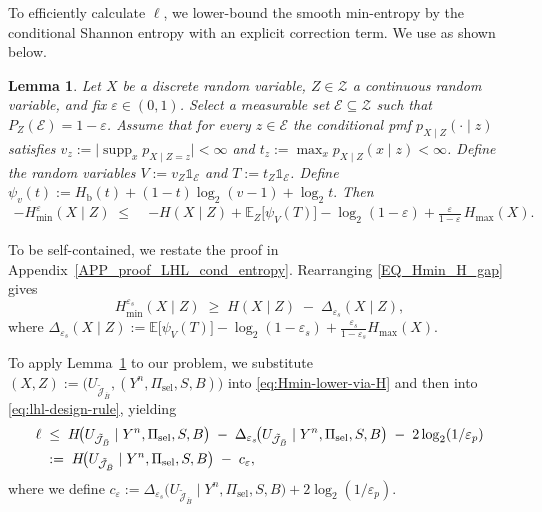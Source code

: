 \documentclass[onecolumn]{IEEEtran} %
\newcommand{\1}{\mathbbm{1}}
\theoremstyle{boldremark}
\DeclareMathOperator{\supp}{supp}
\newtheorem{lemma}{Lemma}
\begin{document}
To efficiently calculate $\ell$, we lower-bound the smooth min-entropy by the conditional Shannon entropy with an explicit correction term.
We use \cite[Lemma~1]{heerklotz2025neuralestimationinformationleakage} as shown below.
\begin{lemma}\label{Lemma_Hmin_H_gap}
Let $X$ be a discrete random variable, $Z\in\mathcal Z$ a continuous random variable, and fix $\varepsilon\in(0,1)$.
Select a measurable set $\mathcal E\subseteq\mathcal Z$ such that $P_Z(\mathcal E)=1-\varepsilon$.
Assume that for every $z\in\mathcal E$ the conditional \gls{pmf} $p_{X\mid Z}(\cdot\mid z)$ satisfies
$v_{z}:=\bigl|\supp_x p_{X\mid Z=z}\bigr|<\infty$ and $t_{z}:=\max_{x}p_{X\mid Z}(x\mid z)<\infty$.
Define the random variables $V:=v_{Z}\mathds{1}_{\mathcal E}$ and $T:=t_{Z}\mathds{1}_{\mathcal E}$.
Define $\psi_{v}(t):=H_{\mathrm b}(t)+(1-t)\log_{2}(v-1)+\log_{2}t.$ Then
{\small
\begin{align}\label{EQ_Hmin_H_gap}
-H_{\min}^{\varepsilon}(X\mid Z)
 \;\le\;&
   -H(X\mid Z)
   +\mathbb{E}_Z\!\bigl[\psi_{V}(T)\bigr]-\log_{2}(1-\varepsilon)
   +\frac{\varepsilon}{1-\varepsilon}\,H_{\max}(X).
\end{align}}
\end{lemma}

To be self-contained, we restate the proof in Appendix~\ref{APP_proof_LHL_cond_entropy}.
Rearranging \eqref{EQ_Hmin_H_gap} gives
\begin{equation}\label{eq:Hmin-lower-via-H}
H_{\min}^{\varepsilon_s}(X\mid Z)
\;\ge\;
H(X\mid Z)
\;-\;
\Delta_{\varepsilon_s}(X\mid Z),
\end{equation}
where $\Delta_{\varepsilon_s}(X\mid Z):=\mathbb{E}\!\big[\psi_V(T)\big]
-\log_2(1-\varepsilon_s)+\frac{\varepsilon_s}{1-\varepsilon_s}H_{\max}(X).$

To apply Lemma~\ref{Lemma_Hmin_H_gap} to our problem, we substitute
$(X,Z):=\bigl(U_{\tilde{\mathcal J}_{\bar{B}}},(Y^n,\Pi_{\mathrm{sel}},S,B)\bigr)$
into \eqref{eq:Hmin-lower-via-H} and then into \eqref{eq:lhl-design-rule}, yielding
\begin{align}
\ell
\;&\le\;
H\!\bigl(U_{\tilde{\mathcal J}_{\bar{B}}}\mid Y^n,\Pi_{\mathrm{sel}},S,B\bigr)
\;-\;
\Delta_{\varepsilon_s}\!\bigl(U_{\tilde{\mathcal J}_{\bar{B}}}\mid Y^n,\Pi_{\mathrm{sel}},S,B\bigr)
\;-\;
2\log_2(1/\varepsilon_p)\notag\\
&:=\;
H\!\bigl(U_{\tilde{\mathcal J}_{\bar{B}}}\mid Y^n,\Pi_{\mathrm{sel}},S,B\bigr)
\;-\;
c_{\varepsilon},\label{EQ_ell}
\end{align}
where we define
$c_{\varepsilon}:=\Delta_{\varepsilon_s}\!\bigl(U_{\tilde{\mathcal J}_{\bar{B}}}\mid Y^n,\Pi_{\mathrm{sel}},S,B\bigr)
+2\log_2(1/\varepsilon_p).$
\end{document}
